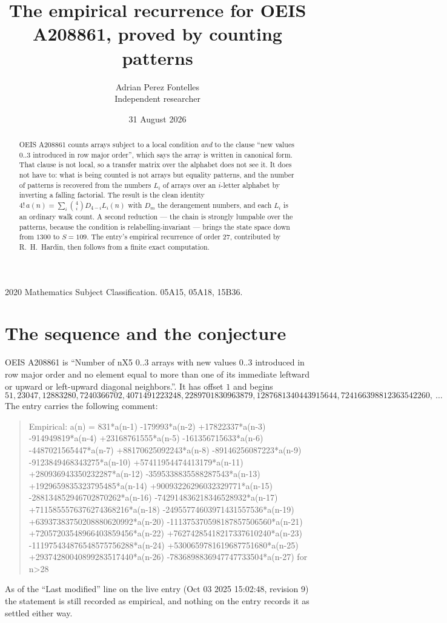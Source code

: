 \documentclass[11pt,a4paper]{article}
\title{The empirical recurrence for OEIS A208861, proved by counting patterns}
\author{Adrian Perez Fontelles\\ \small Independent researcher}
\date{31 August 2026}
\theoremstyle{plain}
\theoremstyle{definition}
\begin{document}
\maketitle

\begin{abstract}
OEIS A208861 counts arrays subject to a local condition \emph{and} to the clause ``new values
$0..3$ introduced in row major order'', which says the array is written in canonical
form. That clause is not local, so a transfer matrix over the alphabet does not see it. It
does not have to: what is being counted is not arrays but equality patterns, and the number
of patterns is recovered from the numbers $L_i$ of arrays over an $i$-letter alphabet by
inverting a falling factorial. The result is the clean identity
$4!\,a(n)=\sum_i\binom{4}{i}D_{4-i}L_i(n)$ with $D_m$ the derangement numbers,
and each $L_i$ is an ordinary walk count. A second reduction --- the chain is strongly
lumpable over the patterns, because the condition is relabelling-invariant --- brings the
state space down from $1300$ to $S=109$. The entry's empirical recurrence of order
$27$, contributed by R.~H.~Hardin, then follows from a finite exact computation.
\end{abstract}

\noindent\small 2020 Mathematics Subject Classification. 05A15, 05A18, 15B36.\normalsize

\section{The sequence and the conjecture}

OEIS A208861 is ``Number of nX5 0..3 arrays with new values 0..3 introduced in row major order and no element equal to more than one of its immediate leftward or upward or left-upward diagonal neighbors.''. It has offset $1$ and begins
\[
51, 23047, 12883280, 7240366702, 4071491223248, 2289701830963879, 1287681340443915644, 724166398812363542260,\ \dots
\]
The entry carries the following comment:
\begin{quote}\small
Empirical: a(n) = 831*a(n-1) -179993*a(n-2) +17822337*a(n-3) -914949819*a(n-4) +23168761555*a(n-5) -161356715633*a(n-6) -4487021565447*a(n-7) +88170625092243*a(n-8) -89146256087223*a(n-9) -9123849468343275*a(n-10) +57411954474413179*a(n-11) +280936943350232287*a(n-12) -3595338835588287543*a(n-13) +1929659835323795485*a(n-14) +90093226296032329771*a(n-15) -288134852946702870262*a(n-16) -742914836218346528932*a(n-17) +7115855576376274368216*a(n-18) -24955774603971431557536*a(n-19) +63937383750208880620992*a(n-20) -111375370598187857506560*a(n-21) +72057203548966403859456*a(n-22) +76274285418217337610240*a(n-23) -111975434876548575756288*a(n-24) +5300659781619687751680*a(n-25) +29374280040899283517440*a(n-26) -7836898836947747733504*a(n-27) for n>28
\end{quote}
As of the ``Last modified'' line on the live entry (Oct 03 2025 15:02:48, revision 9) the statement is
still recorded as empirical, and nothing on the entry records it as settled either way.
\end{document}

